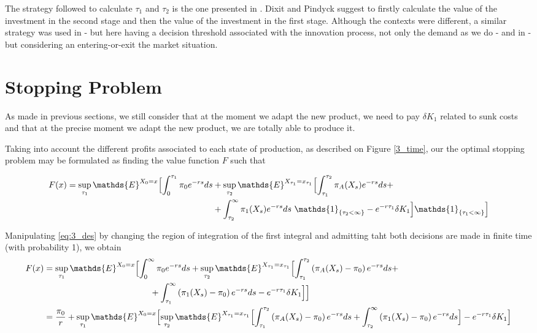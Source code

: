 The strategy followed to calculate $\tau_1$ and $\tau_2$ is the one presented in \cite{dixit:book}. Dixit and Pindyck suggest to firstly
calculate the value of the investment in the second stage and then the value of the investment in the first stage. Although the contexts were different, a similar strategy was used in \cite{rita} - but here having a decision threshold associated with the innovation process, not only the demand as we do - and in \cite{hagspiel:cap} - but considering an entering-or-exit the market situation.

\section{Stopping Problem}
\label{section:2_theory}



As made in previous sections, we still consider that at the moment we adapt the new product, we need to pay $\delta K_1$ related to sunk costs and that at the precise moment we adapt the new product, we are totally able to produce it. 

Taking into account the different profits associated to each state of production, as described on Figure \ref{3_time}, our the optimal stopping problem may be formulated as finding the value function $F$ such that

\begin{align}
F(x)=\sup _{\tau_1} \mathds{E}^{X_0=x} \Bigl[ \int_0^{\tau_1} \pi_0e^{-rs} ds &+ \sup_{\tau_2} \mathds{E}^{X_{\tau_1}=x_{\tau_1}} \Bigl[ \int_{\tau_1}^{\tau_2}  \pi_A(X_s) e^{-rs}ds + \nonumber \\
& +\int_{\tau_2}^\infty \pi_1(X_s)e^{-rs}ds \ \mathds{1}_{ \{\tau_2<\infty \} } -e^{-r \tau_1}\delta K_1  \Bigr] \mathds{1}_{ \{\tau_1<\infty \} } \Bigr]
\label{eq:3_des}
\end{align}


Manipulating \eqref{eq:3_des} by changing the region of integration of the first integral and admitting taht both decisions are made in finite time (with probability 1), we obtain
\begin{align}
F(x)&=\sup _{\tau_1} \mathds{E}^{X_0=x} \Bigl[ \int_0^{\infty} \pi_0e^{-rs} ds +\sup_{\tau_2} \mathds{E}^{X_{\tau_1}=x_{\tau_1}} \Bigl[ \int_{\tau_1}^{\tau_2} \left( \pi_A(X_s)-\pi_0 \right) e^{-rs}ds +  \nonumber \\
&\hspace{4.35cm} +\int_{\tau_1}^\infty \left( \pi_1(X_s)-\pi_0 \right) e^{-rs}ds -e^{-r \tau_1}\delta K_1  \Bigr] \Bigr]   \\
&=\frac{\pi_0}{r}+\sup _{\tau_1} \mathds{E}^{X_0=x} \Bigl[  \sup_{\tau_2} \mathds{E}^{X_{\tau_1}=x_{\tau_1}} \Bigl[ \int_{\tau_1}^{\tau_2} \left( \pi_A(X_s)-\pi_0 \right) e^{-rs}ds + \int_{\tau_2}^\infty \left( \pi_1(X_s)-\pi_0 \right) e^{-rs}ds  \Bigr] -e^{-r \tau_1}\delta K_1 \Bigr] \nonumber
\label{eq:32} 
\end{align}

